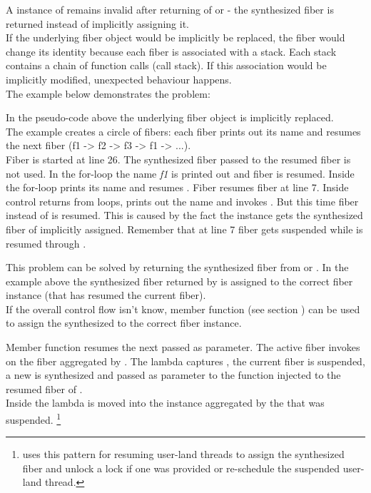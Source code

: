 
\label{fiberreturn}
A instance of \fiber remains invalid after returning of \resume or \resumewith -
the synthesized fiber is returned instead of implicitly assigning it.\\
If the underlying fiber object would be implicitly be replaced, the fiber would 
change its identity because each fiber is associated with a stack. Each stack
contains a chain of function calls (call stack). If this association would be
implicitly modified, unexpected behaviour happens.\\
The example below demonstrates the problem:

In the pseudo-code above the underlying fiber object is implicitly replaced.\\
The example creates a circle of fibers: each fiber prints out its name and
resumes the next fiber (f1 -> f2 -> f3 -> f1 -> ...).\\
Fiber  is started at line 26. The synthesized fiber  passed 
to the resumed fiber is not used. In the for-loop the name \emph{f1} is printed
out and fiber  is resumed. Inside the for-loop  prints its name
and resumes . Fiber  resumes fiber  at line 7. Inside
 control returns from  loops, prints out the name and
invokes . But this time fiber  instead of  is
resumed. This is caused by the fact the instance  gets the synthesized
fiber of  implicitly assigned. Remember that at line 7 fiber 
gets suspended while  is resumed through .

This problem can be solved by returning the synthesized fiber from  \resume or
\resumewith. In the example above the synthesized fiber returned by \resume is
assigned to the correct fiber instance (that has resumed the current fiber).\\

If the overall control flow isn't know, member function \resumewith (see section
) can be used to assign the synthesized to the correct fiber
instance.

Member function  resumes the next  passed as
parameter. The active fiber invokes \resumewith on the fiber aggregated by
. The lambda captures , the current fiber is suspended, a
new \fiber is synthesized and passed as parameter  to the function
injected to the resumed fiber of .\\
Inside the lambda  is moved into the instance  aggregated by the
 that was suspended.
\footnote{\bfiber\cite{bfiber} uses this pattern for resuming user-land threads
to assign the synthesized fiber and unlock a lock if one was provided or
re-schedule the suspended user-land thread.}

